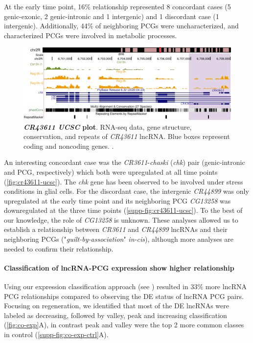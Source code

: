 At the early time point, 16\% relationship represented 8 concordant cases (5 genic-exonic, 2 genic-intronic and 1 intergenic) and 1 discordant case (1 intergenic). Additionally, 44\% of neighboring PCGs were uncharacterized, and characterized PCGs were involved in metabolic processes.

\begin{figure}[ht!]
  \centering
  \includegraphics[width=1\textwidth]{plots/appendix/dme/cr43611.ucsc.plot.pdf}
  \caption[\textit{CR43611 UCSC} plot]{\textbf{\textit{CR43611 UCSC} plot}. RNA-seq data, gene structure, conservation, and repeats of \textit{CR43611} lncRNA. Blue boxes represent coding and noncoding genes. .}
  \label{fig:cr43611-ucsc}
\end{figure}

An interesting concordant case was the \textit{CR3611}-\textit{chaski} (\textit{chk}) pair (genic-intronic and PCG, respectively) which both were upregulated at all time points (\autoref{fig:cr43611-ucsc}). The \textit{chk} gene has been observed to be involved under stress conditions in glial cells.\autocite{delgado_2018} For the discordant case, the intergenic \textit{CR44899} was only upregulated at the early time point and its neighboring PCG \textit{CG13258} was downregulated at the three time points (\autoref{supp-fig:cr43611-ucsc}). To the best of our knowledge, the role of \textit{CG13258} is unknown. These analyses allowed us to establish a relationship between \textit{CR3611} and \textit{CR44899} lncRNAs and their neighboring PCGs ("\textit{guilt-by-association}" \textit{in-cis}\autocite{signal_2016_computational}), although more analyses are needed to confirm their relationship. 

\paragraph{Classification of lncRNA-PCG expression show higher relationship}
\label{paragraph:expression-classification}

Using our expression classification approach (see ) resulted in 33\% more lncRNA PCG relationships compared to observing the DE status of lncRNA PCG pairs. Focusing on regeneration, we identified that most of the DE lncRNAs were labeled as decreasing, followed by valley, peak and increasing classification (\autoref{fig:co-exp}A), in contrast peak and valley were the top 2 more common classes in control (\autoref{supp-fig:co-exp-ctrl}A).  

